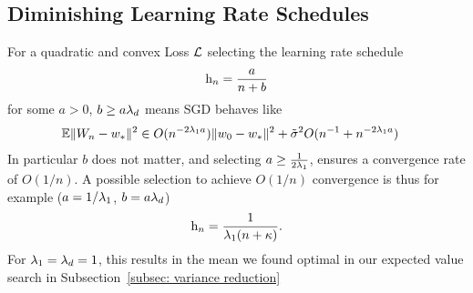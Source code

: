 \subsection{Diminishing Learning Rate Schedules}

\begin{theorem}\label{thm: convergence rates for diminishing lr schedules}
	For a quadratic and convex Loss \(\mathcal{L}\) selecting the learning rate
	schedule
	\begin{align*}
		\text{h}_n = \frac{a}{n+b}	
	\end{align*}
	for some \(a>0\), \(b\ge a\lambda_d\) means SGD behaves like
	\begin{align*}
		\mathbb{E}\|W_n - w_*\|^2 
		&\in O(n^{-2\lambda_1a})\|w_0-w_*\|^2
		+ \tilde{\sigma}^2 O(n^{-1} + n^{-2\lambda_1 a})
	\end{align*}
	In particular \(b\) does not matter, and selecting \(a\ge\tfrac{1}{2\lambda_1}\),
	ensures a convergence rate of \(O(1/n)\). A possible selection to
	achieve \(O(1/n)\) convergence is thus for example (\(a=1/\lambda_1\), \(b=a\lambda_d\))
	\begin{align*}
		\text{h}_n = \frac{1}{\lambda_1(n+\kappa)}.
	\end{align*}
	For \(\lambda_1=\lambda_d=1\), this results in the mean we found
	optimal in our expected value search in Subsection~\ref{subsec: variance
	reduction}
\end{theorem}
